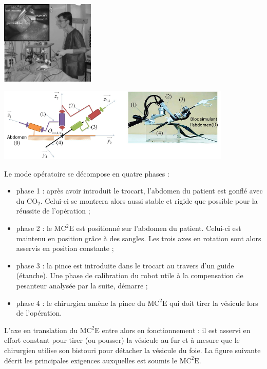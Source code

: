 \documentclass[10pt,fleqn]{article} %
\begin{document}
\begin{center}
\begin{minipage}[c]{.1\linewidth}
\begin{center}
\includegraphics[height=4cm]{images/Sujet/images/fig_01}
\end{center}
\end{minipage} \hfill
\begin{minipage}[c]{.65\linewidth}
\begin{center}
\includegraphics[height=3.5cm]{images/Sujet/images/fig_02}
\end{center}
\end{minipage}
\end{center}

Le mode opératoire se décompose en quatre phases :
\begin{itemize}
\item phase 1 : après avoir introduit le trocart, l’abdomen du patient est gonflé avec du $\text{CO}_2$. Celui-ci se montrera alors aussi stable et rigide que possible pour la réussite de l’opération ;
\item phase 2 : le $\text{MC}^2\text{E}$ est positionné sur l’abdomen du patient. Celui-ci est maintenu en position grâce à des sangles. Les trois axes en rotation sont alors asservis en position constante ;
\item phase 3 : la pince est introduite dans le trocart au travers d’un guide (étanche). Une phase de calibration du robot utile à la compensation de pesanteur analysée par la suite, démarre ;
\item phase 4 : le chirurgien amène la pince du $\text{MC}^2\text{E}$ qui doit tirer la vésicule lors de l’opération. 
\end{itemize}
L’axe en translation du $\text{MC}^2\text{E}$ entre alors en fonctionnement : il est asservi en effort constant pour tirer (ou pousser) la vésicule au fur et à mesure que le chirurgien utilise son bistouri pour détacher la vésicule du foie. La figure suivante décrit les principales exigences auxquelles est soumis le $\text{MC}^2\text{E}$.
\end{document}
